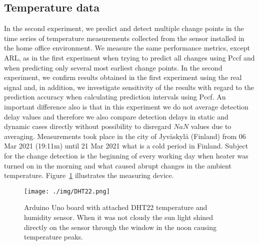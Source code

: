 \subsection{Temperature data}
In the second experiment, we predict and detect multiple change points in the time series of temperature measurements collected from the sensor installed in the home office environment.
We measure the same performance metrics, except ARL, as in the first experiment when trying to predict all changes using Pccf and when predicting only several most earliest change points.
In the second experiment, we confirm results obtained in the first experiment using the real signal and, in addition, we investigate sensitivity of the results with regard to the prediction accuracy when calculating prediction intervals using Pccf.
An important difference also is that in this experiment we do not average detection delay values and therefore we also compare detection delays in static and dynamic cases directly without possibility to disregard $NaN$ values due to averaging.
Measurements took place in the city of Jyv\"{a}skyl\"{a} (Finland) from 06 Mar 2021 (19:11m) until 21 Mar 2021 what is a cold period in Finland.
Subject for the change detection is the beginning of every working day when heater was turned on in the morning and what caused abrupt changes in the ambient temperature.
Figure~\ref{fig:dht22} illustrates the measuring device.
\begin{figure}[htb!]
	\centering
	\texttt{[image: ./img/DHT22.png]}
	\caption{
		Arduino Uno board with attached DHT22 temperature and humidity sensor.
		When it was not cloudy the sun light shined directly on the sensor through the window in the noon causing temperature peaks.
	}
	\label{fig:dht22}
\end{figure}
